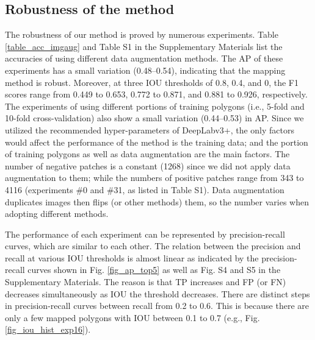 \documentclass[preprint,12pt,authoryear]{elsarticle}
\begin{document}
\subsection{Robustness of the method}
\label{subsec_robustness}

The robustness of our method is proved by numerous experiments. Table \ref{table_acc_imgaug} and Table S1 in the Supplementary Materials list the accuracies of using different data augmentation methods. The AP of these experiments has a small variation (0.48--0.54), indicating that the mapping method is robust. Moreover, at three IOU thresholds of 0.8, 0.4, and 0, the F1 scores range from 0.449 to 0.653, 0.772 to 0.871, and 0.881 to 0.926, respectively. The experiments of using different portions of training polygons (i.e., 5-fold and 10-fold cross-validation) also show a small variation (0.44--0.53) in AP. Since we utilized the recommended hyper-parameters of DeepLabv3+, the only factors would affect the performance of the method is the training data; and the portion of training polygons as well as data augmentation are the main factors. The number of negative patches is a constant (1268) since we did not apply data augmentation to them; while the numbers of positive patches range from 343 to 4116 (experiments \#0 and \#31, as listed in Table S1). Data augmentation duplicates images then flips (or other methods) them, so the number varies when adopting different methods.

The performance of each experiment can be represented by precision-recall curves, which are similar to each other. The relation between the precision and recall at various IOU thresholds is almost linear as indicated by the precision-recall curves shown in Fig. \ref{fig_ap_top5} as well as Fig. S4 and S5 in the Supplementary Materials. The reason is that TP increases and FP (or FN) decreases simultaneously as IOU the threshold decreases. There are distinct steps in precision-recall curves between recall from 0.2 to 0.6. This is because there are only a few mapped polygons with IOU between 0.1 to 0.7 (e.g., Fig. \ref{fig_iou_hist_exp16}).
\end{document}
